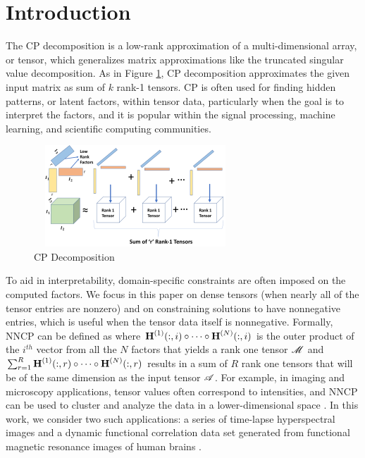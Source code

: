 
\section{Introduction}

The CP decomposition is a low-rank approximation of a multi-dimensional array, or tensor, which generalizes matrix approximations like the truncated singular value decomposition. As in Figure \ref{fig:cpdecomposition}, CP decomposition approximates the given input matrix as sum of $k$ rank-1 tensors.  CP is often used for finding hidden patterns, or latent factors, within tensor data, particularly when the goal is to interpret the factors, and it is popular within the signal processing, machine learning, and scientific computing communities.

\begin{figure}[htbp]
\begin{center}
\includegraphics[width=3in, height=1.5in]{fig/cpdecomposition.pdf}
\caption{CP Decomposition}
\label{fig:cpdecomposition}
\end{center}
\end{figure}


To aid in interpretability, domain-specific constraints are often imposed on the computed factors.
We focus in this paper on dense tensors (when nearly all of the tensor entries are nonzero) and on constraining solutions to have nonnegative entries, which is useful when the tensor data itself is nonnegative. Formally, NNCP can be defined as
where $\Mn{H}{1}(:,i) \circ \cdots \circ \Mn{H}{N}(:,i)$ is the outer product of the $i^{th}$ vector from all the $N$ factors that yields a rank one tensor $\T{M}$ and $\sum_{r=1}^R \Mn{H}{1}(:,r) \circ \cdots \circ \Mn{H}{N}(:,r)$ results in a sum of $R$ rank one tensors that will be of the same dimension as the input tensor $\TA$. 
For example, in imaging and microscopy applications, tensor values often correspond to intensities, and NNCP can be used to cluster and analyze the data in a lower-dimensional space \cite{JC+16}.
In this work, we consider two such applications: a series of time-lapse hyperspectral images \cite{FAN16} and a dynamic functional correlation data set generated from functional magnetic resonance images of human brains \cite{VEU+12}.

